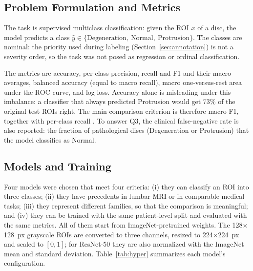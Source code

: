 
\subsection{Problem Formulation and Metrics}
\label{sec:formulation}
The task is supervised multiclass classification: given the ROI $x$ of a disc, the model predicts a class $\hat{y}\in\{\text{Degeneration},\ \text{Normal},\ \text{Protrusion}\}$. The classes are nominal: the priority used during labeling (Section~\ref{sec:annotation}) is not a severity order, so the task was not posed as regression or ordinal classification.

The metrics are accuracy, per-class precision, recall and F1 and their macro averages, balanced accuracy (equal to macro recall), macro one-versus-rest area under the ROC curve, and log loss. Accuracy alone is misleading under this imbalance: a classifier that always predicted Protrusion would get 73\% of the original test ROIs right. The main comparison criterion is therefore macro F1, together with per-class recall \cite{mosquera2024}. To answer Q3, the clinical false-negative rate is also reported: the fraction of pathological discs (Degeneration or Protrusion) that the model classifies as Normal.

\subsection{Models and Training}
\label{sec:models}
Four models were chosen that meet four criteria: (i) they can classify an ROI into three classes; (ii) they have precedents in lumbar MRI or in comparable medical tasks; (iii) they represent different families, so that the comparison is meaningful; and (iv) they can be trained with the same patient-level split and evaluated with the same metrics. All of them start from ImageNet-pretrained weights. The 128$\times$128~px grayscale ROIs are converted to three channels, resized to 224$\times$224~px and scaled to $[0,1]$; for ResNet-50 they are also normalized with the ImageNet mean and standard deviation. Table~\ref{tab:hyper} summarizes each model's configuration.

